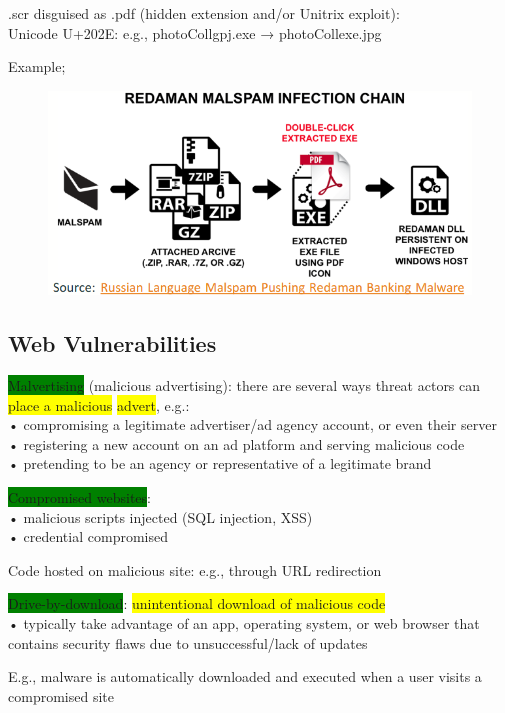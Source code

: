 \documentclass[]{project_plan}
\begin{document}
.scr disguised as .pdf (hidden extension and/or Unitrix exploit):\\
Unicode U+202E: e.g., photoCollgpj.exe → photoCollexe.jpg

\newpage

Example;
\begin{figure}[H]
  \centering
  \includegraphics[width=.8\linewidth]{redaman_malspam_infection_chain.png}
\end{figure}

\subsection{Web Vulnerabilities}

\colorbox{green}{Malvertising} (malicious advertising): there are several ways threat actors can \colorbox{yellow}{place a malicious}
\colorbox{yellow}{advert}, e.g.:\\
• compromising a legitimate advertiser/ad agency account, or even their server\\
• registering a new account on an ad platform and serving malicious code\\
• pretending to be an agency or representative of a legitimate brand

\colorbox{green}{Compromised websites}:\\
• malicious scripts injected (SQL injection, XSS)\\
• credential compromised

Code hosted on malicious site: e.g., through URL redirection

\colorbox{green}{Drive-by-download}: \colorbox{yellow}{unintentional download of malicious code}\\
• typically take advantage of an app, operating system, or web browser that contains security flaws
due to unsuccessful/lack of updates

E.g., malware is automatically downloaded and executed when a user visits a compromised site
\end{document}
